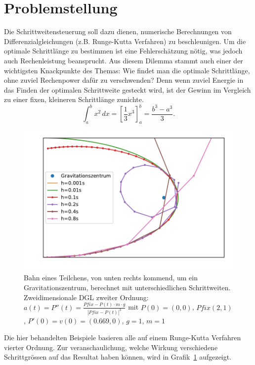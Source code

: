 %
%
%
\section{Problemstellung
\label{steps:section:problemstellung}}
Die Schrittweitensteuerung soll dazu dienen, numerische Berechnungen von Differenzialgleichungen (z.B. Runge-Kutta Verfahren) zu beschleunigen.
Um die optimale Schrittlänge zu bestimmen ist eine Fehlerschätzung nötig,
was jedoch auch Rechenleistung beansprucht.
Aus diesem Dilemma stammt auch einer der wichtigsten Knackpunkte des Themas:
Wie findet man die optimale Schrittlänge, ohne zuviel Rechenpower dafür zu verschwenden?
Denn wenn zuviel Energie in das Finden der optimalen Schrittweite gesteckt wird,
ist der Gewinn im Vergleich zu einer fixen, kleineren Schrittlänge zunichte.
\begin{equation}
\int_a^b x^2\, dx
=
\left[ \frac13 x^3 \right]_a^b
=
\frac{b^3-a^3}3.
\label{steps:equation1}
\end{equation}
\begin{figure}
\centering
\includegraphics{papers/steps/img/gravity_different_fixed_stepsize.pdf}
\caption{Bahn eines Teilchens, von unten rechts kommend,
um ein Gravitationszentrum, berechnet mit unterschiedlichen Schrittweiten.
Zweidimensionale DGL zweiter Ordnung:
$a(t)=P''(t)=\frac{Pfix-P(t)\cdot m\cdot g}{|Pfix-P(t)|^{3}}$
mit $P(0)=(0, 0)$, $Pfix(2, 1)$, $P'(0)=v(0)=(0.669, 0)$, $g=1$, $m=1$
\label{buch:steps:fixed_comparison}}
\end{figure}
Die hier behandelten Beispiele basieren alle auf einem Runge-Kutta Verfahren
vierter Ordnung. Zur veranschaulichung, welche Wirkung verschiedene Schrittgrössen
auf das Resultat haben können, wird in Grafik~\ref{buch:steps:fixed_comparison} aufgezeigt.





